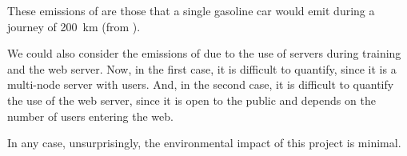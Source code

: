 \begin{exampleBox}
  These emissions of  are those that a single gasoline car would emit
  during a journey of \SI{200}{\km} (from \cite{aragon21:emiss_calcul}).
\end{exampleBox}

We could also consider the emissions of  due to the use of servers
during training and the web server. Now, in the first case, it is difficult to
quantify, since it is a multi-node server with users. And, in the second case,
it is difficult to quantify the use of the web server, since it is open to the
public and depends on the number of users entering the web.

In any case, unsurprisingly, the environmental impact of this project is
minimal.

